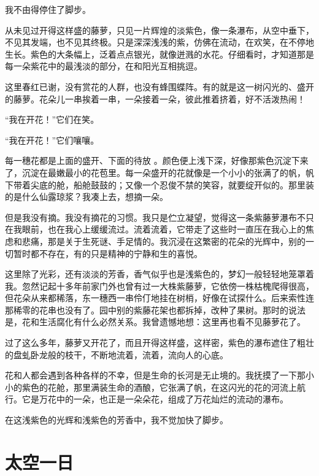 \documentclass[12pt,UTF-8,openany]{ctexbook}
\begin{document}
\begin{large}
    
    我不由得停住了脚步。
    
    从未见过开得这样盛的藤萝，只见一片辉煌的淡紫色，像一条瀑布，从空中垂下，不见其发端，也不见其终极。只是深深浅浅的紫，仿佛在流动，在欢笑，在不停地生长。紫色的大条幅上，泛着点点银光，就像迸溅的水花。仔细看时，才知道那是每一朵紫花中的最浅淡的部分，在和阳光互相挑逗。
    
    这里春红已谢，没有赏花的人群，也没有蜂围蝶阵。有的就是这一树闪光的、盛开的藤萝。花朵儿一串挨着一串，一朵接着一朵，彼此推着挤着，好不活泼热闹！
    
    “我在开花！”它们在笑。
    
    “我在开花！”它们嚷嚷。
    
    每一穗花都是上面的盛开、下面的待放 。颜色便上浅下深，好像那紫色沉淀下来了，沉淀在最嫩最小的花苞里。每一朵盛开的花就像是一个小小的张满了的帆，帆下带着尖底的舱，船舱鼓鼓的；又像一个忍俊不禁的笑容，就要绽开似的。那里装的是什么仙露琼浆？我凑上去，想摘一朵。
    
    但是我没有摘。我没有摘花的习惯。我只是伫立凝望，觉得这一条紫藤萝瀑布不只在我眼前，也在我心上缓缓流过。流着流着，它带走了这些时一直压在我心上的焦虑和悲痛，那是关于生死谜、手足情的。我沉浸在这繁密的花朵的光辉中，别的一切暂时都不存在，有的只是精神的宁静和生的喜悦。
    
    这里除了光彩，还有淡淡的芳香，香气似乎也是浅紫色的，梦幻一般轻轻地笼罩着我。忽然记起十多年前家门外也曾有过一大株紫藤萝，它依傍一株枯槐爬得很高，但花朵从来都稀落，东一穗西一串伶仃地挂在树梢，好像在试探什么。后来索性连那稀零的花串也没有了。园中别的紫藤花架也都拆掉，改种了果树。那时的说法是，花和生活腐化有什么必然关系。我曾遗憾地想：这里再也看不见藤萝花了。
    
    过了这么多年，藤萝又开花了，而且开得这样盛，这样密，紫色的瀑布遮住了粗壮的盘虬卧龙般的枝干，不断地流着，流着，流向人的心底。
    
    花和人都会遇到各种各样的不幸，但是生命的长河是无止境的。我抚摸了一下那小小的紫色的花舱，那里满装生命的酒酿，它张满了帆，在这闪光的花的河流上航行。它是万花中的一朵，也正是一朵朵花，组成了万花灿烂的流动的瀑布。
    
    在这浅紫色的光辉和浅紫色的芳香中，我不觉加快了脚步。
    
\end{large}



\chapter{太空一日}
\end{document}
